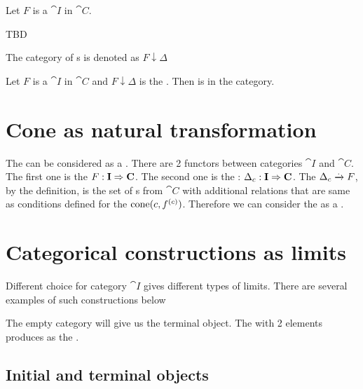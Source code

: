 \begin{definition}
\label{def:category_of_cocones}
Let $F$ is a  $\cat{I}$ in $\cat{C}$.

TBD

The category of s is denoted as $F \downarrow
\Delta$ \cite{wiki:cone}  
\end{definition}


\begin{remark}
\label{rem:category_of_cocones}
Let $F$ is a  $\cat{I}$ in $\cat{C}$
and $F \downarrow \Delta$ is the .
Then  is  in the
category. 
\end{remark}

\section{Cone as natural transformation}
The  can be considered as a .
There are 2 functors between categories $\cat{I}$ and 
$\cat{C}$. The first one is the  $F:
\mathbf{I} \Rightarrow \mathbf{C}$. The second one is the 
: 
$\Delta_c: \mathbf{I} \Rightarrow \mathbf{C}$. The
 $\Delta_c
\xrightarrow{.} F$, by the definition, is the set of s from $\cat{C}$ with
additional relations that are same as conditions defined for
the  $\mathrm{cone}(c, f^{(c)})$. Therefore we can consider
the  as a . 

\section{Categorical constructions as limits}

Different choice for category $\cat{I}$ gives different types of
limits. There are several examples of such constructions below

The empty category will give us the terminal object. The
 with 2 elements produces
 as the .

\subsection{Initial and terminal objects}

